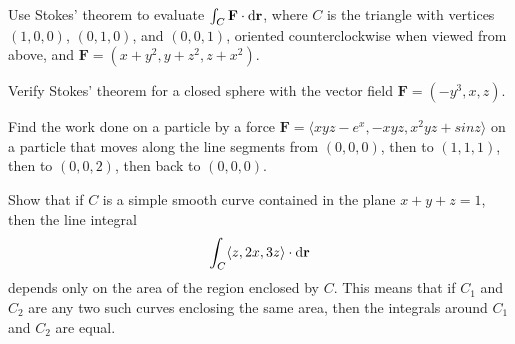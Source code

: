 \documentclass{watsonbook}
\begin{document}

\begin{aexercise}
   Use Stokes' theorem to evaluate $\int_C\mathbf{F} \cdot \mathrm{d}\mathbf{r}$, where $C$ is the triangle with vertices $(1,0,0)$, $(0,1,0)$, and $(0,0,1)$, oriented counterclockwise when viewed from above, and $\mathbf{F} = (x+y^2,y+z^2,z+x^2)$. 
\end{aexercise}

\begin{aexercise}
  Verify Stokes' theorem for a closed sphere with the vector field
$\mathbf{F} = (-y^3,x,z)$. 
\end{aexercise}

\begin{aexercise}
  Find the work done on a particle by a force $\mathbf{F}=\langle
  xyz−e^x, −xyz, x^2yz+sin z \rangle$ on a particle that moves along the line segments from $(0, 0, 0)$, then to $(1, 1, 1)$, then to $(0, 0, 2)$, then back to $(0, 0, 0)$.
\end{aexercise}

\begin{aexercise}
Show that if $C$ is a simple smooth curve contained in the plane
$x+y+z = 1$, then the line integral
\[\int_C \langle z, 2x, 3z \rangle \cdot \mathrm{d}\mathbf{r}\]
depends only on the area of the region enclosed by $C$. This means
that if $C_1$ and $C_2$ are any two such curves enclosing the same area,
then the integrals around $C_1$ and $C_2$ are equal. 
\end{aexercise} 
\end{document}
